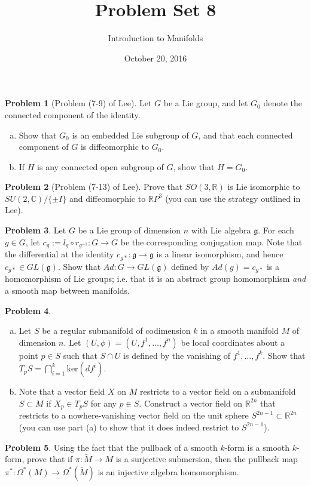 \documentclass{amsart}
\newcommand{\+}[1]{\ensuremath{\mathbf{#1}}}
\newcommand{\C}{{\mathbb C}}
\newcommand{\R}{{\mathbb R}}
\theoremstyle{definition}
\newtheorem{prob}{Problem}
\begin{document}
\title{Problem Set 8}
\date{October 20, 2016}
\author{Introduction to Manifolds}

\maketitle

\begin{prob}[Problem (7-9) of Lee]
 Let $G$ be a Lie group, and let $G_0$ denote the
 connected component of the identity.
\begin{enumerate}[(a)]
 \item Show that $G_0$ is an embedded Lie subgroup of $G$,
 and that each connected component of $G$ is diffeomorphic
 to $G_0$.
 \item If $H$ is any connected open subgroup of $G$, show that
 $H = G_0$. 
\end{enumerate}
 \end{prob}

\begin{prob}[Problem (7-13) of Lee]
 Prove that $SO(3,\R)$ is Lie isomorphic to $SU(2,\C)/\{\pm I\}$
 and diffeomorphic to $\R P^3$ (you can use the strategy outlined in Lee).
\end{prob}



\begin{prob}
Let $G$ be a Lie group of dimension $n$ with Lie algebra $\mathfrak{g}$.
For each $g \in G$, let $c_g := l_g \circ r_{g^{-1}}:G \to G$
be the corresponding conjugation map.  Note that
the differential at the identity $c_{g*}: \mathfrak{g} \to \mathfrak{g}$
is a linear isomorphism, and hence $c_{g*} \in GL(\mathfrak{g})$.
Show that $Ad: G \to GL(\mathfrak{g})$ defined by
$Ad(g) = c_{g*}$ is a homomorphism of Lie groups; i.e. that
it is an abstract group homomorphism \emph{and} a smooth map between
manifolds.
\end{prob}

\begin{prob}
\begin{enumerate}[(a)]
 \item Let $S$ be a regular submanifold of codimension $k$ in a smooth manifold $M$ of dimension $n$.
Let $(U,\phi) = (U, f^1, \ldots, f^n)$ be local coordinates about a point $p \in S$
such that $S \cap U$ is defined by the vanishing of $f^1, \ldots, f^k$.
Show that $T_pS = \bigcap^k_{i = 1} \text{ker} (df^i)$.
\item Note that a vector field $X$ on $M$ restricts to a vector field on a submanifold $S \subset M$ if $X_p \in T_pS$
for any $p \in S$.  Construct a vector field on $\R^{2n}$ that restricts to a nowhere-vanishing vector
field on the unit sphere $S^{2n-1} \subset \R^{2n}$ (you can use part (a) to show that it does indeed
restrict to $S^{2n-1}$).
\end{enumerate}
\end{prob}




\begin{prob}
Using the fact that the pullback of a smooth $k$-form is a
smooth $k$-form, prove that if $\pi: \tilde{M}\to M$
is a surjective submersion, then the pullback map
$\pi^*: \Omega^*(M) \to \Omega^*(\tilde{M})$ is
an injective algebra homomorphism.
\end{prob}
\end{document}
